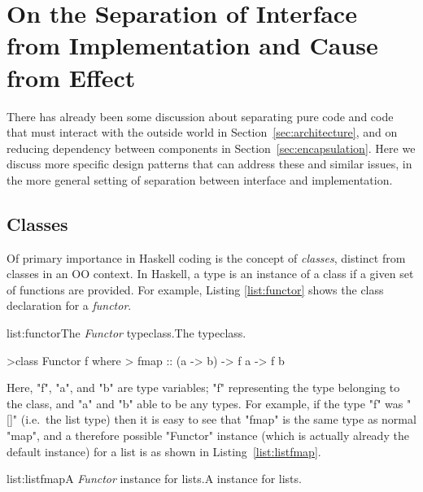 \section[On the Separation of Interface from Implementation and Cause from Effect]{On the Separation of Interface from Implementation and Cause from Effect}
\label{sec:pure}

There has already been some discussion about separating pure code and code that must interact with the outside world in Section~\ref{sec:architecture}, and on reducing dependency between components in Section~\ref{sec:encapsulation}. Here we discuss more specific design patterns that can address these and similar issues, in the more general setting of separation between interface and implementation.

\subsection{Classes}

Of primary importance in Haskell coding is the concept of \emph{classes}, distinct from classes in an OO context. In Haskell, a type is an instance of a class if a given set of functions are provided. For example, Listing \ref{list:functor} shows the class declaration for a \emph{functor}.

\vspace{-0.5em}
\begin{listing}{list:functor}{The \emph{Functor} typeclass.}{The  typeclass.}{}
\end{listing}\vspace{-1.5em}

\begin{haskell}
>class Functor f where
>  fmap :: (a -> b) -> f a -> f b

\end{haskell}
\noindent Here, "f", "a", and "b" are type variables; "f" representing the type belonging to the class, and "a" and "b" able to be any types. For example, if the type "f" was "[]" (i.e.\ the list type) then it is easy to see that "fmap" is the same type as normal "map", and a therefore possible "Functor" instance (which is actually already the default instance) for a list is as shown in Listing~\ref{list:listfmap}.

\vspace{-0.5em}
\begin{listing}{list:listfmap}{A \emph{Functor} instance for lists.}{A  instance for lists.}{}
\end{listing}\vspace{-1.5em}

